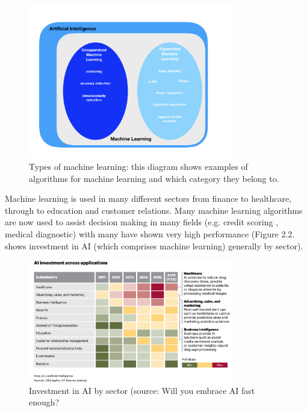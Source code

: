 \begin{figure}[H]
\centering
\includegraphics[width=0.8\textwidth]{ThesisTemplate/usingLatex/images/Figure1.png}
\caption{Types of machine learning: this diagram shows examples of algorithms for machine learning and which category they belong to.}
\end{figure}


Machine learning is used in many different sectors from finance to healthcare, through to education and customer relations. Many machine learning algorithms are now used to assist decision making in many fields (e.g. credit scoring \citep{Guegan:2018ey}, medical diagnostic) with many have shown very high performance (Figure 2.2. shows investment in AI (which comprises machine learning) generally by sector).

\begin{figure}[H]
\centering
\includegraphics[width=0.8\textwidth]{ThesisTemplate/usingLatex/images/fig2_2.png}
\caption{Investment in AI by sector (source: Will you embrace AI fast enough? \citep{Evans:sHGdqFvY}}
\end{figure}

